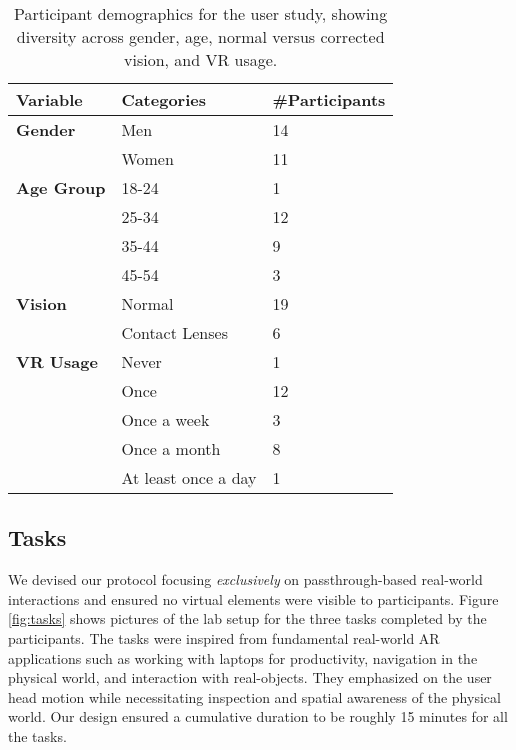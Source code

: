 \begin{table}[!ht]
  \caption{Participant demographics for the user study, showing diversity across gender, age, normal versus corrected vision, and VR usage.}
  \label{tab:demographics}
  \begin{tabular}{l|l|l}
    \toprule
     \textbf{Variable} & \textbf{Categories} & \textbf{\#Participants}\\
    \midrule
    \textbf{Gender} &Men &14\\
    & Women &11\\
    \midrule
    \textbf{Age Group} &18-24 &1\\
    &25-34 &12\\
    &35-44 &9\\
    &45-54 &3\\
    \midrule
    \textbf{Vision} &Normal &19\\
    &Contact Lenses &6\\
    \midrule
    \textbf{VR Usage} &Never &1\\
    &Once &12\\
    &Once a week &3\\
    &Once a month &8\\
    &At least once a day &1\\
    \bottomrule
  \end{tabular}
\end{table}

\subsection{Tasks}\label{subsec:tasks} 

We devised our protocol focusing \emph{exclusively} on passthrough-based real-world interactions and ensured no virtual elements \cite{de2024visual} were visible to participants. Figure \ref{fig:tasks} shows pictures of the lab setup for the three tasks completed by the participants. The tasks were inspired from fundamental real-world AR applications such as working with laptops for productivity, navigation in the physical world, and interaction with real-objects. They emphasized on the user head motion while  necessitating inspection and spatial awareness of the physical world.
Our design ensured a cumulative duration to be roughly 15 minutes for all the tasks.

